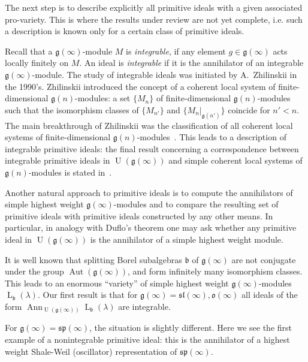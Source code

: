 \documentclass{emsprocart}
\begin{document}
The next step is to describe explicitly all primitive ideals with a given associated pro-variety. This is where the results under review are not yet complete, i.e. such a description is known only for a certain class of primitive ideals.

Recall that a $\mathfrak g(\infty)$-module $M$ is {\it integrable}, if any element $g\in\mathfrak g(\infty)$ acts locally finitely on $M$. An ideal is {\it integrable} if it is the annihilator of an integrable $\mathfrak g(\infty)$-module. The study of integrable ideals was initiated by A.~Zhilinskii in the 1990's. Zhilinskii introduced the concept of a coherent local system of finite-dimensional $\mathfrak g(n)$-modules: a set $\{M_n\}$ of finite-dimensional $\mathfrak g(n)$-modules such that the isomorphism classes of $\{M_{n'}\}$ and $\{{M_n}|_{\mathfrak g(n')}\}$ coincide for $n'<n$. The main breakthrough of Zhilinskii was the classification of all coherent local systems of finite-dimensional $\mathfrak g(n)$-modules~\cite{Zh1, Zh2, Zh3}. This leads to a description of integrable primitive ideals: the final result concerning a correspondence between integrable primitive ideals in $\operatorname{U}(\mathfrak g(\infty))$ and simple coherent local systems of $\mathfrak g(n)$-modules is stated in~\cite{PP1}.

Another natural approach to primitive ideals is to compute the annihilators of simple highest weight $\mathfrak g(\infty)$-modules and to compare the resulting set of primitive ideals  with primitive ideals constructed by any other means. In particular, in analogy with Duflo's theorem one may ask whether any primitive ideal in $\operatorname{U}(\mathfrak g(\infty))$ is the annihilator of a simple highest weight module.

It is well known that splitting Borel subalgebras $\mathfrak b$ of ${\mathfrak g}(\infty)$ are not conjugate under the group 
$\operatorname{Aut}(\mathfrak g(\infty))$, and form infinitely many isomorphism classes. This leads to an 
enormous ``variety'' of simple highest weight ${\mathfrak{g}}(\infty)$-modules $\operatorname{L}_{\mathfrak{b}}(\lambda)$. 
Our first result is that for $\mathfrak g(\infty)=\mathfrak{sl}(\infty), \mathfrak{o}(\infty)$ all ideals of the form 
$\operatorname{Ann}_{\operatorname{U}(\mathfrak g(\infty))}\operatorname{L}_\mathfrak b(\lambda)$ are integrable.

For $\mathfrak{g}(\infty)=\mathfrak{sp}(\infty)$, the situation is slightly different. Here we see the first example of a nonintegrable primitive ideal: this is the annihilator of a highest weight Shale-Weil (oscillator) representation of $\mathfrak{sp}(\infty)$. %
\end{document}

